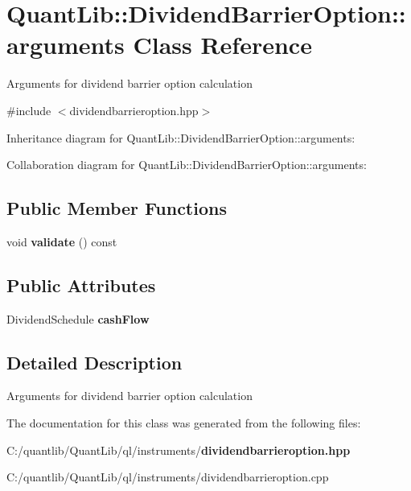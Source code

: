 \section{Quant\+Lib\+:\+:Dividend\+Barrier\+Option\+:\+:arguments Class Reference}
\label{class_quant_lib_1_1_dividend_barrier_option_1_1arguments}


Arguments for dividend barrier option calculation  




{\ttfamily \#include $<$dividendbarrieroption.\+hpp$>$}



Inheritance diagram for Quant\+Lib\+:\+:Dividend\+Barrier\+Option\+:\+:arguments\+:


Collaboration diagram for Quant\+Lib\+:\+:Dividend\+Barrier\+Option\+:\+:arguments\+:
\subsection*{Public Member Functions}
\begin{DoxyCompactItemize}
\item 
void {\bfseries validate} () const \label{class_quant_lib_1_1_dividend_barrier_option_1_1arguments_acab2bbdcd0835dea412e476a38bbcada}

\end{DoxyCompactItemize}
\subsection*{Public Attributes}
\begin{DoxyCompactItemize}
\item 
Dividend\+Schedule {\bfseries cash\+Flow}\label{class_quant_lib_1_1_dividend_barrier_option_1_1arguments_aba17506abf23bc49d9a6f152c832244b}

\end{DoxyCompactItemize}


\subsection{Detailed Description}
Arguments for dividend barrier option calculation 

The documentation for this class was generated from the following files\+:\begin{DoxyCompactItemize}
\item 
C\+:/quantlib/\+Quant\+Lib/ql/instruments/{\bf dividendbarrieroption.\+hpp}\item 
C\+:/quantlib/\+Quant\+Lib/ql/instruments/dividendbarrieroption.\+cpp\end{DoxyCompactItemize}
